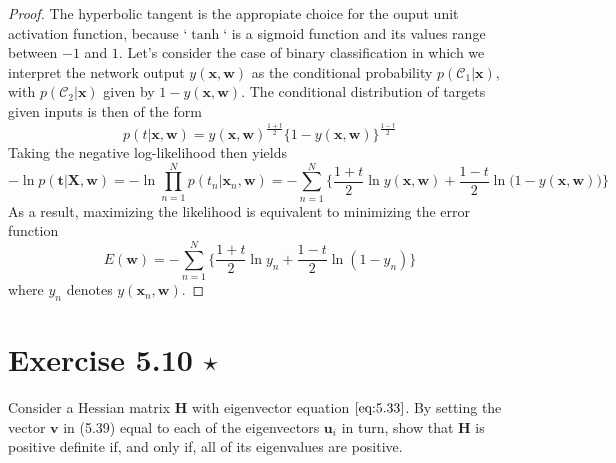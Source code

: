 \vspace{1em}

\begin{proof}
    The hyperbolic tangent is the appropiate choice for the ouput unit
    activation function, because `$\tanh$` is a sigmoid function and its
    values range between $-1$ and $1$. Let's consider the case of binary 
    classification in which we interpret the network output $y(\mathbf{x}, \mathbf{w})$
    as the conditional probability $p(\mathcal{C}_1 | \mathbf{x})$, with
    $p(\mathcal{C}_2 | \mathbf{x})$ given by $1 - y(\mathbf{x}, \mathbf{w})$. The
    conditional distribution of targets given inputs is then of the form
    \[
        p(t | \mathbf{x}, \mathbf{w}) 
        = y(\mathbf{x}, \mathbf{w})^{\frac{1+t}{2}} 
        \big\{1 - y(\mathbf{x}, \mathbf{w})\big\}^{\frac{1-t}{2}}
    \] 
    Taking the negative log-likelihood then yields
    \[
        -\ln p(\mathbf{t} | \mathbf{X}, \mathbf{w})
        = -\ln \prod_{n = 1}^N p(t_n | \mathbf{x}_n, \mathbf{w})
        = -\sum_{n=1}^{N} \bigg\{\frac{1+t}{2} \ln y(\mathbf{x}, \mathbf{w}) 
        + \frac{1-t}{2} \ln\big(1 - y(\mathbf{x}, \mathbf{w})\big)\bigg\}
    \] 
    As a result, maximizing the likelihood is equivalent to minimizing 
    the error function
    \[
        E(\mathbf{w}) = -\sum_{n=1}^{N} \bigg\{\frac{1+t}{2} \ln y_n + \frac{1-t}{2} \ln(1 -  y_n)\bigg\}
    \] 
    where $y_n$ denotes $y(\mathbf{x}_n, \mathbf{w})$.
\end{proof}

\section*{Exercise 5.10 $\star$}
Consider a Hessian matrix $\mathbf{H}$ with eigenvector equation $\eqref{eq:5.33}$. By
setting the vector $\mathbf{v}$ in (5.39) equal to each of the eigenvectors
$\mathbf{u}_i$ in turn, show that $\mathbf{H}$ is positive definite if,
and only if, all of its eigenvalues are positive.

\vspace{1em}

